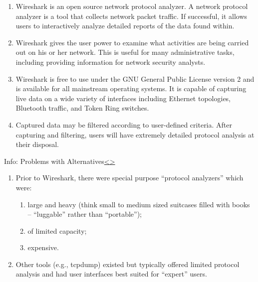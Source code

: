 \documentclass[12pt]{extarticle}
\newenvironment{instructionblock}{\Large\bgroup}{\egroup}
\newcommand{\ben}{\begin{enumerate}}
\newcommand{\een}{\end{enumerate}}
\begin{document}
	\ben
		\item Wireshark\cite{wireshark} is an open source network protocol analyzer. A network protocol analyzer is a tool that collects network packet traffic. If successful, it allows users to interactively analyze detailed reports of the data found within. 
		
		\item Wireshark gives the user power to examine what activities are being carried out on his or her network. This is useful for many administrative tasks, including providing information for network security analysts. \cite{wireshark} 
		
		\item Wireshark is free to use under the GNU General Public License version 2 and is available for all mainstream operating systems. It is capable of capturing live data on a wide variety of interfaces including Ethernet topologies, Bluetooth traffic, and Token Ring switches. 
		
		\item Captured data may be filtered according to user-defined criteria. After capturing and filtering, users will have extremely detailed protocol analysis at their disposal. \cite{wireshark} 
	\een
	
	\pagebreak
	
	
	
	
	\begin{slide}{Info: Problems with Alternatives}{\hyperref[slide 5]{\textless}\hyperref[slide 7]{\textgreater}}
		\begin{instructionblock}
			\ben
				\item Prior to Wireshark, there were special purpose ``protocol analyzers'' which were:
				\ben
				\item large and heavy (think small to medium sized suitcases filled with books -- ``luggable'' rather than ``portable'');
				\item of limited capacity;
				\item expensive.
				\een
				\item Other tools (e.g., tcpdump) existed but typically offered limited protocol analysis and had user interfaces best suited for ``expert'' users.
			\een
		\end{instructionblock}
	\end{slide}
	\vspace{4mm}
	
\end{document}
